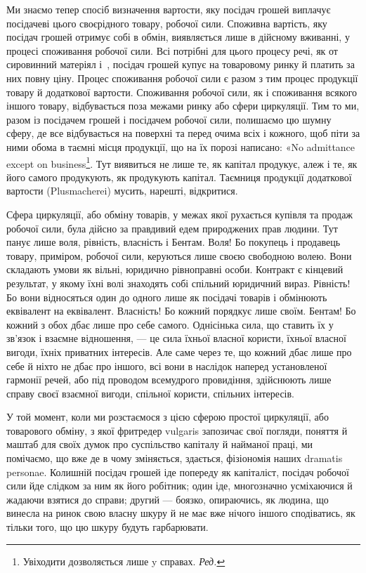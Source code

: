 Ми знаємо тепер спосіб визначення вартости, яку посідач
грошей виплачує посідачеві цього своєрідного товару, робочої
сили. Споживна вартість, яку посідач грошей отримує собі в
обмін, виявляється лише в дійсному вживанні, у процесі споживання
робочої сили. Всі потрібні для цього процесу речі, як от
сировинний матеріял і~, посідач грошей купує на товаровому
ринку й платить за них повну ціну. Процес споживання
робочої сили є разом з тим процес продукції товару й додаткової
вартости. Споживання робочої сили, як і споживання всякого
іншого товару, відбувається поза межами ринку або сфери циркуляції.
Тим то ми, разом із посідачем грошей і посідачем робочої
сили, полишаємо цю шумну сферу, де все відбувається на поверхні
та перед очима всіх і кожного, щоб піти за ними обома в таємні
місця продукції, що на їх порозі написано: «No admittance except
on business\footnote*{
Увіходити дозволяється лише y справах. \emph{Ред.}
}. Тут виявиться не лише те, як капітал продукує,
алеж і те, як його самого продукують, як продукують капітал.
Таємниця продукції додаткової вартости (Plusmacherei) мусить,
нарешті, відкритися.

Сфера циркуляції, або обміну товарів, у межах якої рухається
купівля та продаж робочої сили, була дійсно за правдивий
едем природжених прав людини. Тут панує лише воля, рівність,
власність і Бентам. Воля! Бо покупець і продавець товару, приміром,
робочої сили, керуються лише своєю свободною волею.
Вони складають умови як вільні, юридично рівноправні особи.
Контракт є кінцевий результат, у якому їхні волі знаходять собі
спільний юридичний вираз. Рівність! Бо вони відносяться один
до одного лише як посідачі товарів і обмінюють еквівалент на
еквівалент. Власність! Бо кожний порядкує лише своїм. Бентам!
Бо кожний з обох дбає лише про себе самого. Однісінька
сила, що ставить їх у зв’язок і взаємне відношення, — це сила
їхньої власної користи, їхньої власної вигоди, їхніх приватних
інтересів. Але саме через те, що кожний дбає лише про себе й
ніхто не дбає про іншого, всі вони в наслідок наперед установленої
гармонії речей, або під проводом всемудрого провидіння,
здійснюють лише справу своєї взаємної вигоди, спільної користи,
спільних інтересів.

У той момент, коли ми розстаємося з цією сферою простої
циркуляції, або товарового обміну, з якої фритредер vulgaris
запозичає свої погляди, поняття й маштаб для своїх думок про
суспільство капіталу й найманої праці, ми помічаємо, що вже де
в чому зміняється, здається, фізіономія наших dramatis personae.
Колишній посідач грошей іде попереду як капіталіст, посідач
робочої сили йде слідком за ним як його робітник; один іде,
многозначно усміхаючися й жадаючи взятися до справи; другий —
боязко, опираючись, як людина, що винесла на ринок свою власну
шкуру й не має вже нічого іншого сподіватись, як тільки того,
що цю шкуру будуть гарбарювати.
